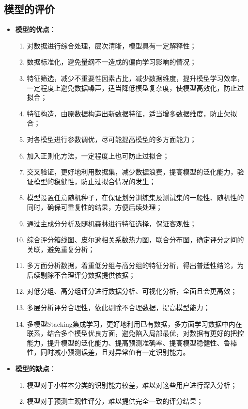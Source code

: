 \documentclass{MathorCupmodeling}
\begin{document}
	\subsection{模型的评价}
	\begin{itemize}
		\item \textbf{模型的优点}：
			\begin{enumerate}
				\item 对数据进行综合处理，层次清晰，模型具有一定解释性；
				\item 数据标准化，避免量纲不一造成的偏向学习影响的情况；
				\item 特征筛选，减少不重要性因素占比，减少数据维度，提升模型学习效率，一定程度上避免数据噪声，适当降低模型复杂度，使模型高效化，防止过拟合；
				\item 特征构造，由原数据构造出新数据特征，适当增多数据维度，防止欠拟合；
				\item 对各模型进行参数调优，尽可能提高模型的多方面能力；
				\item 加入正则化方法，一定程度上也可防止过拟合；
				\item 交叉验证，更好地利用数据集，减少数据浪费，提高模型的泛化能力，验证模型的稳健性，防止过拟合情况的发生；
				\item 模型设置任意随机种子，在保证划分训练集及测试集的一般性、随机性的同时，确保可重复性的结果，方便后续处理；
				\item 通过主成分分析及随机森林进行特征选择，保证客观性；
				\item 综合评分箱线图、皮尔逊相关系数热力图，联合分布图，确定评分之间的关联，避免重复分析；
				\item 多方面分析数据，着重低分组与高分组的特征分析，得出普适性结论，为后续剔除不合理评分数据提供依据；
				\item 对低分组、高分组评分进行数据分析、可视化分析，全面且会更高效；
				\item 多层分析评分合理性，依此剔除不合理数据，提高模型能力；
				\item 多模型Stacking集成学习，更好地利用已有数据，多方面学习数据中内在联系，结合多个模型优良方面，避免陷入局部最优，对数据有更好的把控能力，提升模型的泛化能力、提高预测准确率、提高模型稳健性、鲁棒性，同时减小预测误差，且对异常值有一定识别能力。
			\end{enumerate}
		\item \textbf{模型的缺点}：
			\begin{enumerate}
				\item 模型对于小样本分类的识别能力较差，难以对这些用户进行深入分析；
				\item 模型对于预测主观性评分，难以提供完全一致的评分结果；

\end{enumerate}
\end{itemize}
\end{document}
